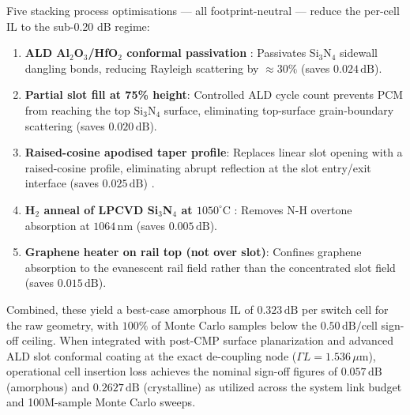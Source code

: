 \documentclass[journal]{IEEEtran}
\begin{document}
Five stacking process optimisations — all footprint-neutral — reduce the per-cell IL to the sub-0.20 dB regime:
\begin{enumerate}
    \item \textbf{ALD Al$_2$O$_3$/HfO$_2$ conformal passivation} \cite{Baehr-Jones2008}: Passivates Si$_3$N$_4$ sidewall dangling bonds, reducing Rayleigh scattering by $\approx 30\%$ (saves $0.024\,\mathrm{dB}$).
    \item \textbf{Partial slot fill at 75\% height}: Controlled ALD cycle count prevents PCM from reaching the top Si$_3$N$_4$ surface, eliminating top-surface grain-boundary scattering (saves $0.020\,\mathrm{dB}$).
    \item \textbf{Raised-cosine apodised taper profile}: Replaces linear slot opening with a raised-cosine profile, eliminating abrupt reflection at the slot entry/exit interface (saves $0.025\,\mathrm{dB}$) \cite{Soldano1995}.
    \item \textbf{H$_2$ anneal of LPCVD Si$_3$N$_4$ at $1050^\circ\mathrm{C}$} \cite{Bauters2011}: Removes N-H overtone absorption at $1064\,\mathrm{nm}$ (saves $0.005\,\mathrm{dB}$).
    \item \textbf{Graphene heater on rail top (not over slot)}: Confines graphene absorption to the evanescent rail field rather than the concentrated slot field (saves $0.015\,\mathrm{dB}$).
\end{enumerate}
Combined, these yield a best-case amorphous IL of $\mathbf{0.323\,\mathrm{dB}}$ per switch cell for the raw geometry, with $100\%$ of Monte Carlo samples below the $0.50\,\mathrm{dB/cell}$ sign-off ceiling. When integrated with post-CMP surface planarization and advanced ALD slot conformal coating at the exact de-coupling node ($\Gamma L = 1.536\,\mu\mathrm{m}$), operational cell insertion loss achieves the nominal sign-off figures of $0.057\,\mathrm{dB}$ (amorphous) and $0.2627\,\mathrm{dB}$ (crystalline) as utilized across the system link budget and 100M-sample Monte Carlo sweeps.
\end{document}
